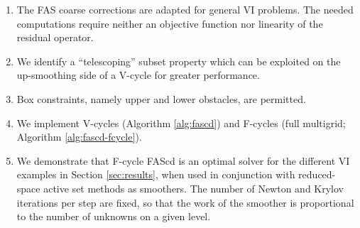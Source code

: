 \documentclass[letterpaper,final,12pt,reqno]{amsart}
\theoremstyle{cstyle}
\theoremstyle{cstyle*}
\theoremstyle{dstyle}
\numberwithin{equation}{section}
\numberwithin{figure}{section}
\numberwithin{table}{section}
\numberwithin{theorem}{section}
\newcommand{\pef}[1]{\todo[inline, color=red!20]{PF: #1}}
\begin{document}
\begin{enumerate}
\item The FAS coarse corrections are adapted for general VI problems. The needed computations require neither an objective function nor linearity of the residual operator.
\item We identify a ``telescoping'' subset property which can be exploited on the up-smoothing side of a V-cycle for greater performance.
\item Box constraints, namely upper and lower obstacles, are permitted.
\item We implement V-cycles (Algorithm \ref{alg:fascd}) and F-cycles (full multigrid; Algorithm \ref{alg:fascd-fcycle}).
\item We demonstrate that F-cycle FAScd is an optimal solver for the different VI examples in Section \ref{sec:results}, when used in conjunction with reduced-space active set methods as smoothers. The number of Newton and Krylov iterations per step are fixed, so that the work of the smoother is proportional to the number of unknowns on a given level.
\end{enumerate}
\end{document}
